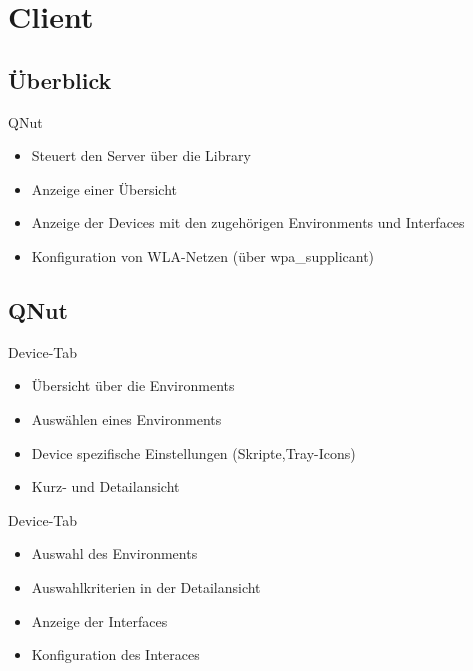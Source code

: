 
\section{Client}
\subsection{Überblick}
\begin{frame}[<+-| alert@+>]{QNut}
	\begin{itemize}
		\item Steuert den Server über die Library
		\item Anzeige einer Übersicht
		\item Anzeige der Devices mit den zugehörigen Environments und Interfaces
		\item Konfiguration von WLA-Netzen (über wpa\_supplicant)
	\end{itemize}
\end{frame}

\subsection{QNut}
\begin{frame}[<+-| alert@+>]{Device-Tab}
	\begin{itemize}
		\item Übersicht über die Environments
		\item Auswählen eines Environments
		\item Device spezifische Einstellungen (Skripte,Tray-Icons)
		\item Kurz- und Detailansicht
	\end{itemize}
\end{frame}

\begin{frame}[<+-| alert@+>]{Device-Tab}
	\begin{itemize}
		\item Auswahl des Environments
		\item Auswahlkriterien in der Detailansicht
		\item Anzeige der Interfaces
		\item Konfiguration des Interaces
	\end{itemize}
\end{frame}
